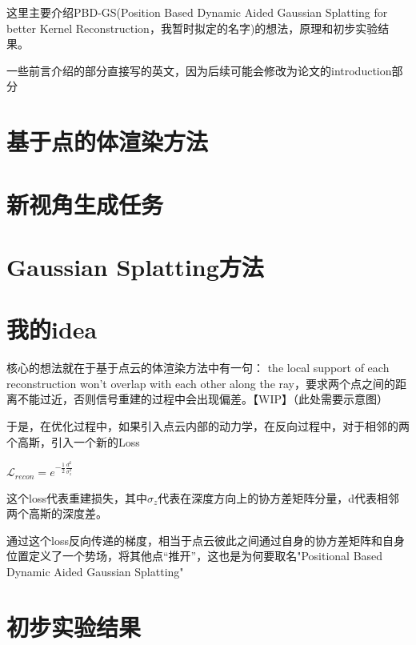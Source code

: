 这里主要介绍PBD-GS(Position Based Dynamic Aided Gaussian Splatting for better Kernel Reconstruction，我暂时拟定的名字)的想法，原理和初步实验结果。

一些前言介绍的部分直接写的英文，因为后续可能会修改为论文的introduction部分

\section{基于点的体渲染方法}



\section{新视角生成任务}



\section{Gaussian Splatting方法}


\section{我的idea}

核心的想法就在于基于点云的体渲染方法中有一句： the local support of each reconstruction won’t overlap with each other along the ray，要求两个点之间的距离不能过近，否则信号重建的过程中会出现偏差。【WIP】（此处需要示意图）

于是，在优化过程中，如果引入点云内部的动力学，在反向过程中，对于相邻的两个高斯，引入一个新的Loss

$\mathcal{L}_{recon} = e^{-\frac{1}{2}\frac{d^2}{\sigma_z^2}}$

这个loss代表重建损失，其中$\sigma_z$代表在深度方向上的协方差矩阵分量，d代表相邻两个高斯的深度差。

通过这个loss反向传递的梯度，相当于点云彼此之间通过自身的协方差矩阵和自身位置定义了一个势场，将其他点“推开”，这也是为何要取名"Positional Based Dynamic Aided Gaussian Splatting"

\section{初步实验结果}


